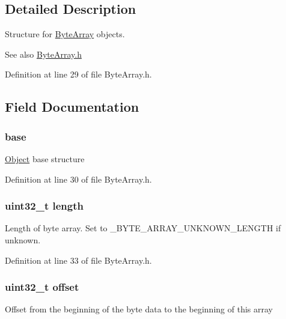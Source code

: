 \subsection{Detailed Description}
Structure for \hyperlink{struct_m_i_byte_array}{ByteArray} objects. 

\begin{DoxySeeAlso}{See also}
\hyperlink{_m_i_byte_array_8h}{ByteArray.h} 
\end{DoxySeeAlso}


Definition at line 29 of file ByteArray.h.



\subsection{Field Documentation}
\hypertarget{struct_m_i_byte_array_ad0814be49cef65d1662b278c4c591509}{
\subsubsection[{base}]{ {\bf base}}}
\label{struct_m_i_byte_array_ad0814be49cef65d1662b278c4c591509}
\hyperlink{struct_m_i_object}{Object} base structure 

Definition at line 30 of file ByteArray.h.

\hypertarget{struct_m_i_byte_array_aebb70c2aab3407a9f05334c47131a43b}{
\subsubsection[{length}]{\setlength{\rightskip}{0pt plus 5cm}uint32\_\-t {\bf length}}}
\label{struct_m_i_byte_array_aebb70c2aab3407a9f05334c47131a43b}
Length of byte array. Set to \_\-BYTE\_\-ARRAY\_\-UNKNOWN\_\-LENGTH if unknown. 

Definition at line 33 of file ByteArray.h.

\hypertarget{struct_m_i_byte_array_a894bdfa2d603d8343f8ef01dda6fcd23}{
\subsubsection[{offset}]{\setlength{\rightskip}{0pt plus 5cm}uint32\_\-t {\bf offset}}}
\label{struct_m_i_byte_array_a894bdfa2d603d8343f8ef01dda6fcd23}
Offset from the beginning of the byte data to the beginning of this array 

